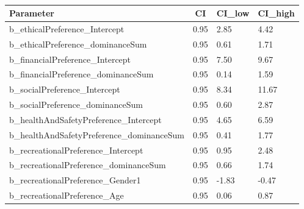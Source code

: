 \documentclass[
  english,
  a4paper,floatsintext]{apa7}
\begin{document}
\begin{table}[tbp]

\begin{center}
\begin{threeparttable}

\caption{\label{tab:unnamed-chunk-6}}

\begin{tabular}{llll}
\toprule
Parameter & \multicolumn{1}{c}{CI} & \multicolumn{1}{c}{CI\_low} & \multicolumn{1}{c}{CI\_high}\\
\midrule
b\_ethicalPreference\_Intercept & 0.95 & 2.85 & 4.42\\
b\_ethicalPreference\_dominanceSum & 0.95 & 0.61 & 1.71\\
b\_financialPreference\_Intercept & 0.95 & 7.50 & 9.67\\
b\_financialPreference\_dominanceSum & 0.95 & 0.14 & 1.59\\
b\_socialPreference\_Intercept & 0.95 & 8.34 & 11.67\\
b\_socialPreference\_dominanceSum & 0.95 & 0.60 & 2.87\\
b\_healthAndSafetyPreference\_Intercept & 0.95 & 4.65 & 6.59\\
b\_healthAndSafetyPreference\_dominanceSum & 0.95 & 0.41 & 1.77\\
b\_recreationalPreference\_Intercept & 0.95 & 0.95 & 2.48\\
b\_recreationalPreference\_dominanceSum & 0.95 & 0.66 & 1.74\\
b\_recreationalPreference\_Gender1 & 0.95 & -1.83 & -0.47\\
b\_recreationalPreference\_Age & 0.95 & 0.06 & 0.87\\
\bottomrule
\end{tabular}

\end{threeparttable}
\end{center}

\end{table}
\end{document}
